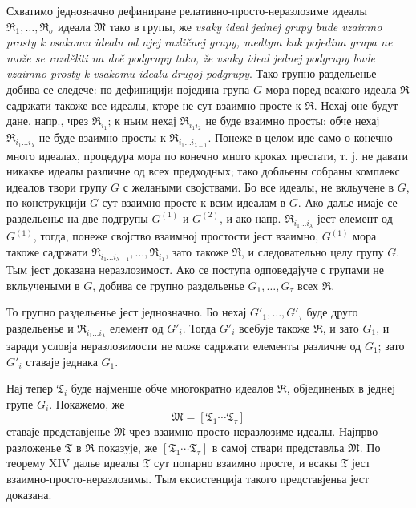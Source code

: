 ﻿\documentclass[11pt]{article}
\newcommand{\ideal}[1]{\mathfrak{#1}}
\begin{document}
Схватимо једнозначно дефиниране релативно-просто-неразлозиме идеалы \(\ideal R_1,\ldots,\ideal R_\sigma\) идеала \(\ideal M\) тако в групы, же \emph{vsaky ideal jednej grupy bude vzaimno prosty k vsakomu idealu od njej različnej grupy, medtym kak pojedina grupa ne može se razděliti na dvě podgrupy tako, že vsaky ideal jednej podgrupy bude vzaimno prosty k vsakomu idealu drugoj podgrupy}. Тако групно раздельенье добива се следече: по дефиницији поједина група \(G\) мора поред всакого идеала \(\ideal R\) садржати такоже все идеалы, кторе не сут взаимно просте к \(\ideal R\). Нехај оне будут дане, напр., чрез \(\ideal R_{i_1}\); к ньим нехај \(\ideal R_{i_1i_2}\) не буде взаимно просты; обче нехај \(\ideal R_{i_1\ldots i_\lambda}\) не буде взаимно просты к \(\ideal R_{i_1\ldots i_{\lambda-1}}\). Понеже в целом иде само о конечно много идеалах, процедура мора по конечно много кроках престати, т. ј. не давати никакве идеалы различне од всех предходных; тако добльены собраны комплекс идеалов твори групу \(G\) с желаными својствами. Бо все идеалы, не вкльучене в \(G\), по конструкцији \(G\) сут взаимно просте к всим идеалам в \(G\). Ако далье имаје се раздельенье на две подгрупы \(G^{(1)}\) и \(G^{(2)}\), и ако напр. \(\ideal R_{i_1\ldots i_\lambda}\) јест елемент од \(G^{(1)}\), тогда, понеже својство взаимној простости јест взаимно, \(G^{(1)}\) мора такоже садржати \(\ideal R_{i_1\ldots i_{\lambda-1}},\ldots,\ideal R_{i_1}\), зато такоже \(\ideal R\), и следовательно целу групу \(G\). Тым јест доказана неразлозимост. Ако се поступа одповедајуче с групами не вкльучеными в \(G\), добива се групно раздельенье \(G_1,\ldots,G_\tau\) всех \(\ideal R\).

То групно раздельенье јест једнозначно. Бо нехај \(G'_1,\ldots,G'_\tau\) буде друго раздельенье и \(\ideal R_{i_1\ldots i_\lambda}\) елемент од \(G'_i\). Тогда \(G'_i\) всебује такоже \(\ideal R\), и зато \(G_1\), и заради условја неразлозимости не може садржати елементы различне од \(G_1\); зато \(G'_i\) ставаје једнака \(G_1\).

Нај тепер \(\ideal T_i\) буде најменше обче многократно идеалов \(\ideal R\), објединеных в једнеј групе \(G_i\). Покажемо, же
\[
 \ideal M=[\ideal T_1\cdots\ideal T_\tau]
\]
ставаје представјенье \(\ideal M\) чрез взаимно-просто-неразлозиме идеалы. Најпрво разложенье \(\ideal T\) в \(\ideal R\) показује, же \([\ideal T_1\cdots\ideal T_\tau]\) в самој ствари представльа \(\ideal M\). По теорему XIV далье идеалы \(\ideal T\) сут попарно взаимно просте, и всакы \(\ideal T\) јест взаимно-просто-неразлозимы. Тым ексистенција такого представјеньа јест доказана.
\end{document}

